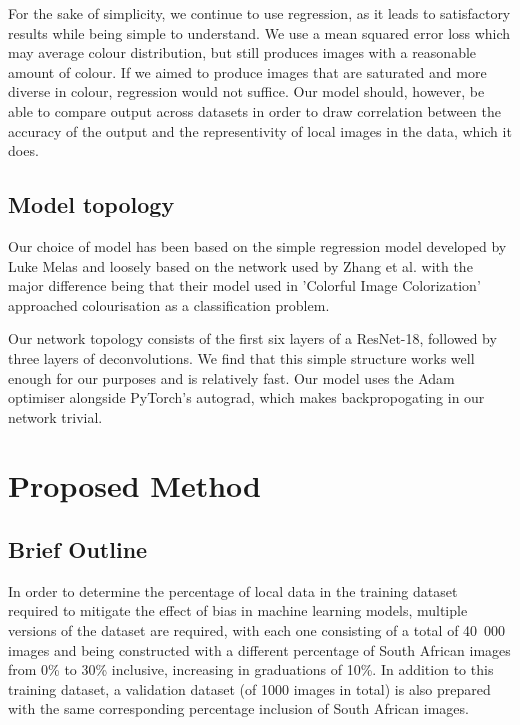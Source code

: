 \documentclass[conference]{IEEEtran}
\begin{document}
For the sake of simplicity, we continue to use regression, as it leads to satisfactory results while being simple to understand. We use a mean squared error loss which may average colour distribution, but still produces images with a reasonable amount of colour. If we aimed to produce images that are saturated and more diverse in colour, regression would not suffice. Our model should, however, be able to compare output across datasets in order to draw correlation between the accuracy of the output and the representivity of local images in the data, which it does.

\subsection{Model topology}

Our choice of model has been based on the simple regression model developed by Luke Melas \cite{melas2018mark} and loosely based on the network used by Zhang et al. \cite{zhang2016colorful}\cite{zhang2017real} with the major difference being that their model used in 'Colorful Image Colorization'\cite{zhang2016colorful} approached colourisation as a classification problem.

Our network topology consists of the first six layers of a ResNet-18, followed by three layers of deconvolutions. We find that this simple structure works well enough for our purposes and is relatively fast. Our model uses the Adam optimiser alongside PyTorch's autograd, which makes backpropogating in our network trivial.

\section{Proposed Method}


\subsection{Brief Outline}

In order to determine the percentage of local data in the training dataset required to mitigate the effect of bias in machine learning models, multiple versions of the dataset are required, with each one consisting of a total of 40~000 images and being constructed with a different percentage of South African images from 0\% to 30\% inclusive, increasing in graduations of 10\%. In addition to this training dataset, a validation dataset (of 1000 images in total) is also prepared with the same corresponding percentage inclusion of South African images.
\end{document}
